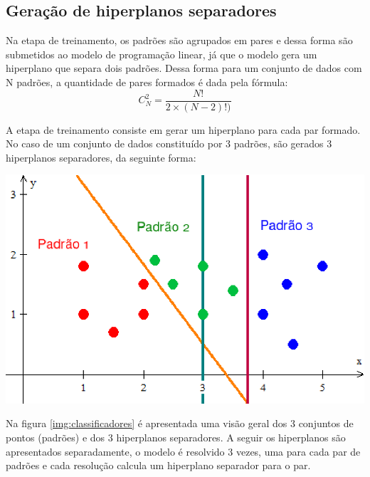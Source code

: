 \subsection{Geração de hiperplanos separadores}
Na etapa de treinamento, os padrões são agrupados em pares e dessa forma são submetidos ao modelo de programação linear, já que o modelo gera um hiperplano que separa dois padrões. Dessa forma para um conjunto de dados com N padrões, a quantidade de pares formados é dada pela fórmula:
$$ C_{N}^{2}=\frac{N!}{2\times (N-2)!)} $$

A etapa de treinamento consiste em gerar um hiperplano para cada par formado. No caso de um conjunto de dados constituído por 3 padrões, são gerados 3 hiperplanos separadores, da seguinte forma:

\begin{center}
	\includegraphics[scale=0.5]{graficos/class123}
	\label{img:classificadores}
\end{center}

Na figura \ref{img:classificadores} é apresentada uma visão geral dos 3 conjuntos de pontos (padrões) e dos 3 hiperplanos separadores. A seguir os hiperplanos são apresentados separadamente, o modelo é resolvido 3 vezes, uma para cada par de padrões e cada resolução calcula um hiperplano separador para o par.
 
